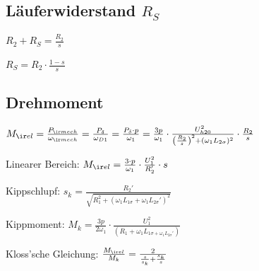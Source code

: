 \documentclass[german]{latex4ei_fs}
\begin{document}
\begin{sectionbox}
\subsection{Läuferwiderstand $R_S$}

$R_2 + R_S = \frac{R_2}{s}$

$R_S = R_2 \cdot \frac{1 - s}{s}$ 
\end{sectionbox}

\begin{sectionbox}
\subsection{Drehmoment}

$M_{\ir el} = \frac{P_{\ir mech}}{\omega_{\ir mech}} = \frac{P_\delta}{\omega_{D1}} = \frac{P_\delta \cdot p}{\omega_1} = \frac{3 p }{\omega_1} \cdot \frac{U_{h20}^2}{\left(\frac{R_2}{s}\right)^2 + (\omega_1 L_{2 \sigma})^2} \cdot \frac{R_2}{s}$

Linearer Bereich: $M_{\ir el} = \frac{3 \cdot p}{\omega_1} \cdot \frac{U_1^2}{R_2'} \cdot s$

Kippschlupf: $s_k = \frac{R_2'}{\sqrt{R_1^2 + (\omega_1 L_{1 \sigma} + \omega_1 L_{2 \sigma}')^2}}$

Kippmoment: $M_k = \frac{3p}{2 \omega_1} \cdot \frac{U_1^2}{(R_1 + \omega_1 L_{1 \sigma + \omega_1 L_{2 \sigma}'})}$

Kloss'sche Gleichung: $\frac{M_{\ir el}}{M_k} = \frac{2}{\frac{s}{s_k} + \frac{s_k}{s}}$
\end{sectionbox}
\end{document}
